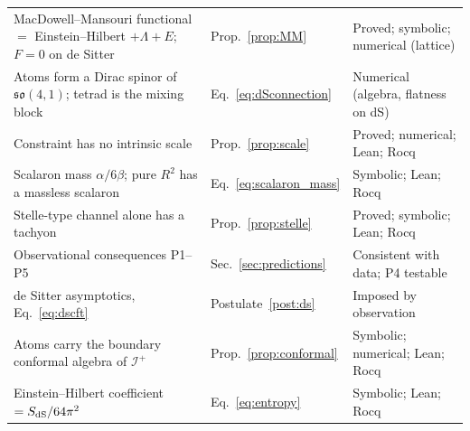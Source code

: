 \documentclass[reprint,aps,prd,amsmath,amssymb,superscriptaddress,nofootinbib,floatfix]{revtex4-2}
\theoremstyle{plain}
\theoremstyle{definition}
\theoremstyle{remark}
\begin{document}
\begin{table}[t]
\begin{ruledtabular}
\begin{tabular}{lll}
\parbox[t]{0.52\textwidth}{\raggedright MacDowell--Mansouri functional $=$ Einstein--Hilbert $+\Lambda+E$; $F=0$ on de Sitter\strut} & \parbox[t]{0.17\textwidth}{\raggedright Prop.~\ref{prop:MM}\strut} & \parbox[t]{0.25\textwidth}{\raggedright Proved; symbolic; numerical (lattice)\strut} \\
\parbox[t]{0.52\textwidth}{\raggedright Atoms form a Dirac spinor of $\mathfrak{so}(4,1)$; tetrad is the mixing block\strut} & \parbox[t]{0.17\textwidth}{\raggedright Eq.~\eqref{eq:dSconnection}\strut} & \parbox[t]{0.25\textwidth}{\raggedright Numerical (algebra, flatness on dS)\strut} \\
\parbox[t]{0.52\textwidth}{\raggedright Constraint has no intrinsic scale\strut} & \parbox[t]{0.17\textwidth}{\raggedright Prop.~\ref{prop:scale}\strut} & \parbox[t]{0.25\textwidth}{\raggedright Proved; numerical; Lean; Rocq\strut} \\
\parbox[t]{0.52\textwidth}{\raggedright Scalaron mass $\alpha/6\beta$; pure $R^2$ has a massless scalaron\strut} & \parbox[t]{0.17\textwidth}{\raggedright Eq.~\eqref{eq:scalaron_mass}\strut} & \parbox[t]{0.25\textwidth}{\raggedright Symbolic; Lean; Rocq\strut} \\
\parbox[t]{0.52\textwidth}{\raggedright Stelle-type channel alone has a tachyon\strut} & \parbox[t]{0.17\textwidth}{\raggedright Prop.~\ref{prop:stelle}\strut} & \parbox[t]{0.25\textwidth}{\raggedright Proved; symbolic; Lean; Rocq\strut} \\
\parbox[t]{0.52\textwidth}{\raggedright Observational consequences P1--P5\strut} & \parbox[t]{0.17\textwidth}{\raggedright Sec.~\ref{sec:predictions}\strut} & \parbox[t]{0.25\textwidth}{\raggedright Consistent with data; P4 testable\strut} \\
\parbox[t]{0.52\textwidth}{\raggedright de Sitter asymptotics, Eq.~\eqref{eq:dscft}\strut} & \parbox[t]{0.17\textwidth}{\raggedright Postulate~\ref{post:ds}\strut} & \parbox[t]{0.25\textwidth}{\raggedright Imposed by observation\strut} \\
\parbox[t]{0.52\textwidth}{\raggedright Atoms carry the boundary conformal algebra of $\mathcal{I}^+$\strut} & \parbox[t]{0.17\textwidth}{\raggedright Prop.~\ref{prop:conformal}\strut} & \parbox[t]{0.25\textwidth}{\raggedright Symbolic; numerical; Lean; Rocq\strut} \\
\parbox[t]{0.52\textwidth}{\raggedright Einstein--Hilbert coefficient $=S_{\rm dS}/64\pi^2$\strut} & \parbox[t]{0.17\textwidth}{\raggedright Eq.~\eqref{eq:entropy}\strut} & \parbox[t]{0.25\textwidth}{\raggedright Symbolic; Lean; Rocq\strut} \\

\end{tabular}
\end{ruledtabular}
\end{table}
\end{document}
